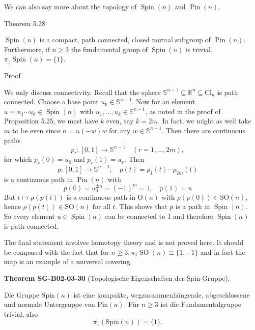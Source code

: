 \documentclass[10pt, letterpaper]{article}
\newcommand{\Spin}{\mathrm{Spin}}
\newcommand{\Pin}{\mathrm{Pin}}
\newcommand{\CustomHeading}[3]{%
  \par\medskip\noindent%
  \textbf{#1 #2} \textnormal{(#3)}.\enskip%
}
\newenvironment{THEO}[2]{\begin{unitbox}\CustomHeading{Theorem}{#1}{#2}}{\end{unitbox}}
\begin{document}
We can also say more about the topology of $\operatorname{Spin}(n)$ and $\operatorname{Pin}(n)$.



Theorem 5.28

$\operatorname{Spin}(n)$ is a compact, path connected, closed normal subgroup of $\operatorname{Pin}(n)$. Furthermore, if $n \geqslant 3$ the fundamental group of $\operatorname{Spin}(n)$ is trivial, $\pi_{1} \operatorname{Spin}(n)=\{1\}$.



Proof


We only discuss connectivity. Recall that the sphere $\mathbb{S}^{n-1} \subseteq \mathbb{R}^{n} \subseteq \mathrm{Cl}_{n}$ is path connected. Choose a base point $u_{0} \in \mathbb{S}^{n-1}$. Now for an element $u=u_{1} \cdots u_{k} \in \operatorname{Spin}(n)$ with $u_{1}, \ldots, u_{k} \in \mathbb{S}^{n-1}$, as noted in the proof of Proposition 5.25, we must have $k$ even, say $k=2 m$. In fact, we might as well take $m$ to be even since $u=u(-w) w$ for any $w \in \mathbb{S}^{n-1}$. Then there are continuous paths
$$
p_{r}:[0,1] \longrightarrow \mathbb{S}^{n-1} \quad(r=1, \ldots, 2 m),
$$
for which $p_{r}(0)=u_{0}$ and $p_{r}(1)=u_{r}$. Then
$$
p:[0,1] \longrightarrow \mathbb{S}^{n-1} ; \quad p(t)=p_{1}(t) \cdots p_{2 m}(t)
$$
is a continuous path in $\operatorname{Pin}(n)$ with
$$
p(0)=u_{0}^{2 m}=(-1)^{m}=1, \quad p(1)=u
$$
But $t \mapsto \rho(p(t))$ is a continuous path in $\mathrm{O}(n)$ with $\rho(p(0)) \in \mathrm{SO}(n)$, hence $\rho(p(t)) \in \mathrm{SO}(n)$ for all $t$. This shows that $p$ is a path in $\operatorname{Spin}(n)$. So every element $u \in \operatorname{Spin}(n)$ can be connected to 1 and therefore $\operatorname{Spin}(n)$ is path connected.

The final statement involves homotopy theory and is not proved here. It should be compared with the fact that for $n \geqslant 3, \pi_{1} \operatorname{SO}(n) \cong\{1,-1\}$ and in fact the map is an example of a universal covering.



\begin{THEO}{SG-B02-03-30}{Topologische Eigenschaften der Spin-Gruppe}
Die Gruppe \(\Spin(n)\) ist eine kompakte, wegzusammenhängende, abgeschlossene und normale Untergruppe von \(\Pin(n)\). 
Für \(n\ge 3\) ist die Fundamentalgruppe trivial, also
\[
\pi_1(\Spin(n))=\{1\}.
\]
\end{THEO}
\end{document}
